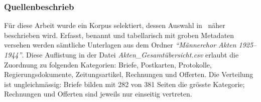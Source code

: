\documentclass[12pt, a4paper, ngerman, bidi=default]{article}
\begin{document}
\subsubsection{Quellenbeschrieb}\label{Dokumententypen}
\noindent
\begin{minipage}[t]{0.49\textwidth}
  \justifying
  Für diese Arbeit wurde ein Korpus selektiert, dessen Auswahl in~ näher beschrieben wird. 
  Erfasst, benannt und tabellarisch mit groben Metadaten versehen werden sämtliche Unterlagen aus dem Ordner \textit{\enquote{Männerchor Akten 1925--1944}}. 
  Diese Auflistung in der Datei \textit{Akten\_Gesamtübersicht.csv} erlaubt die Zuordnung zu folgenden Kategorien: Briefe, Postkarten, Protokolle, Regierungsdokumente, Zeitungsartikel, 
  Rechnungen und Offerten. Die Verteilung ist ungleichmässig: Briefe bilden mit 282 von 381 Seiten die grösste Kategorie; Rechnungen und Offerten sind jeweils nur einseitig vertreten.
\end{minipage}%
\hfill
\begin{minipage}[t]{0.49\textwidth}
  \centering
  \vspace*{0.3cm} %
  \label{fig:dokumententypen-bar}
\end{minipage}
\end{document}
